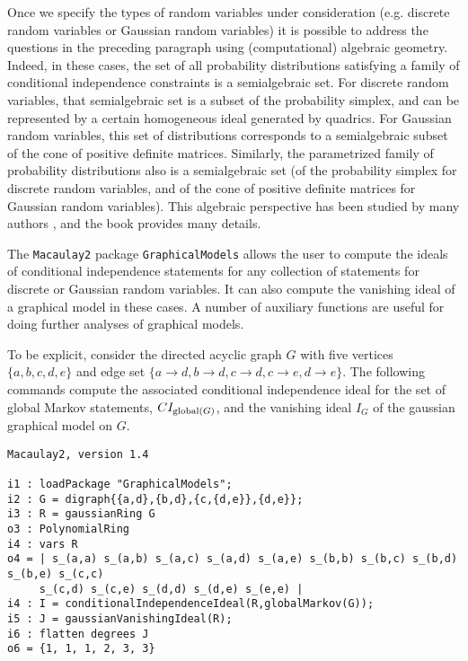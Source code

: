 \documentclass[letterpaper]{article}
\theoremstyle{definition}
\begin{document}
Once we specify the types of random variables under consideration
(e.g. discrete random variables or Gaussian random variables) it
is possible to address the questions in the preceding paragraph
using (computational) algebraic geometry.  Indeed, in these cases,
the set of all probability distributions satisfying a family of 
conditional independence constraints is a semialgebraic set.
For discrete random variables, that semialgebraic set is a subset
of the probability simplex, and can be represented by a certain
homogeneous ideal generated by quadrics.  For Gaussian random variables,
this set of distributions corresponds to a semialgebraic subset
of the cone of positive definite matrices.  Similarly,
the parametrized family of probability distributions also
is a semialgebraic set (of the probability simplex for discrete
random variables, and of the cone of positive definite matrices
for Gaussian random variables).  This algebraic perspective
has been studied by many authors %
\cite{ GSS, GMS, S}, and the book \cite{DSS}
provides many details.

The {\tt Macaulay2} package {\tt GraphicalModels} allows the user to compute
the ideals of conditional independence statements for any collection
of statements for discrete or Gaussian
random variables.  It can also compute the vanishing ideal of 
a graphical model in these cases.  A number of auxiliary functions
are useful for doing further analyses of graphical models.

To be explicit, consider the directed acyclic graph $G$ with  five
vertices $\{a,b,c,d,e\}$ and edge
set $\{a \to d, b \to d, c \to d, c \to e, d \to e\}$.
The following commands compute the associated conditional
independence ideal for the set of global Markov statements,
$CI_{{\rm global}(G)}$, and 
the vanishing ideal $I_{G}$ of the gaussian graphical model on $G$.


\begin{verbatim}
Macaulay2, version 1.4

i1 : loadPackage "GraphicalModels";
i2 : G = digraph{{a,d},{b,d},{c,{d,e}},{d,e}}; 
i3 : R = gaussianRing G
o3 : PolynomialRing
i4 : vars R
o4 = | s_(a,a) s_(a,b) s_(a,c) s_(a,d) s_(a,e) s_(b,b) s_(b,c) s_(b,d) s_(b,e) s_(c,c) 
     s_(c,d) s_(c,e) s_(d,d) s_(d,e) s_(e,e) |
i4 : I = conditionalIndependenceIdeal(R,globalMarkov(G));
i5 : J = gaussianVanishingIdeal(R);
i6 : flatten degrees J
o6 = {1, 1, 1, 2, 3, 3}
\end{verbatim}
\end{document}
